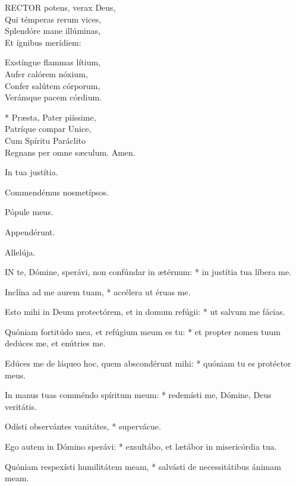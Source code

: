 \lettrine[lines=2]{R}{ECTOR} potens, verax Deus,\\
Qui témperas rerum vices,\\
Splendóre mane illúminas,\\
Et ígnibus merídiem:

Exstíngue flammas lítium,\\
Aufer calórem nóxium,\\
Confer salútem córporum,\\
Verámque pacem córdium.

* Præsta, Pater piíssime,\\
Patríque compar Unice,\\
Cum Spíritu Paráclito\\
Regnans per omne sæculum. Amen.

  In tua justítia.



 Commendémus nosmetípsos.


 Pópule meus.


 Appendérunt.

  Allelúja.


\lettrine[lines=2]{I}{N} te, Dómine, sperávi, non confúndar in ætérnum: * in justítia tua líbera me.

Inclína ad me aurem tuam, * accélera ut éruas me.

Esto mihi in Deum protectórem, et in domum refúgii: * ut salvum me fácias.

Quóniam fortitúdo mea, et refúgium meum es tu: * et propter nomen tuum dedúces me, et enútries me.

Edúces me de láqueo hoc, quem abscondérunt mihi: * quóniam tu es protéctor meus.

In manus tuas comméndo spíritum meum: * redemísti me, Dómine, Deus veritátis.

Odísti observántes vanitátes, * supervácue.

Ego autem in Dómino sperávi: * exsultábo, et lætábor in misericórdia tua.

Quóniam respexísti humilitátem meam, * salvásti de necessitátibus ánimam meam.

